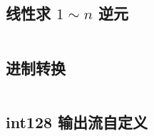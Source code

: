 \documentclass[a4paper]{article}
\begin{document}
\begin{multicols}{2}
\begin{spacing}{0.6}
\subsection{\texorpdfstring{线性求 \(1 \sim n\) 逆元}{线性求 1 至 n 逆元}}
\inputminted{cpp}{\detokenize{Template/一些杂碎/02B - 线性求1~n逆元.txt}}

\subsection{进制转换}
\inputminted{cpp}{\detokenize{Template/一些杂碎/03 - 进制转换.txt}}

\subsection{int128 输出流自定义}
\inputminted{cpp}{\detokenize{Template/一些杂碎/04 - int128 输出流自定义.txt}}

\end{spacing}
\end{multicols}
\end{document}
